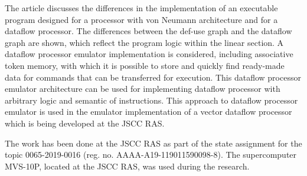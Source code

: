 \documentclass[
11pt,%
tightenlines,%
twoside,%
onecolumn,%
nofloats,%
nobibnotes,%
nofootinbib,%
superscriptaddress,%
noshowpacs,%
centertags]%
{revtex4}
\begin{document}
The article discusses the differences in the implementation of an executable program designed for a processor with von Neumann architecture and for a dataflow processor.
The differences between the def-use graph and the dataflow graph are shown, which reflect the program logic within the linear section.
A dataflow processor emulator implementation is considered, including associative token memory, with which it is possible to store and quickly find ready-made data for commands that can be transferred for execution.
This dataflow processor emulator architecture can be used for implementing dataflow processor with arbitrary logic and semantic of instructions.
This approach to dataflow processor emulator is used in the emulator implementation of a vector dataflow processor which is being developed at the JSCC RAS.

\begin{acknowledgments}
The work has been done at the JSCC RAS as part of the state assignment for the topic 0065-2019-0016 (reg. no. AAAA-A19-119011590098-8).
The supercomputer MVS-10P, located at the JSCC RAS, was used during the research.
\end{acknowledgments}
\end{document}
